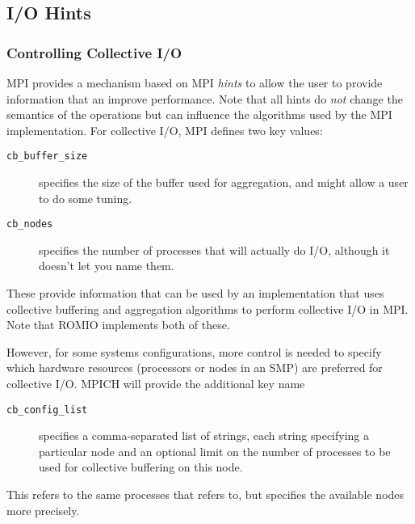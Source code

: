 \subsection{I/O Hints}

\subsubsection{Controlling Collective I/O}

MPI provides a mechanism based on MPI \emph{hints} to allow the user to
provide information that an improve performance.  Note that all hints do
\emph{not} change the semantics of the operations but can influence the
algorithms used by the MPI implementation.  For collective I/O, MPI defines
two  key values:
\begin{description}
\item[\texttt{cb_buffer_size}] specifies the size of the buffer used for
  aggregation, and might allow a user to do some tuning.
\item[\texttt{cb_nodes}]specifies the number of processes that will actually
  do I/O, although it doesn't let you name them.
\end{description}
These provide information that can be used by an implementation that uses
collective buffering and aggregation algorithms to perform collective I/O in
MPI.  Note that ROMIO implements both of these.


However, for some systems configurations, more control is needed to specify
which hardware resources (processors or nodes in an SMP) are preferred for
collective I/O.  MPICH will provide the additional  key name
\begin{description}
\item[\texttt{cb_config_list}]specifies a comma-separated list of strings,
  each string specifying a particular node and an optional limit on the number
  of processes to be used for collective buffering on this node.  
\end{description}
This refers to the same processes that  refers to, but
specifies the available nodes more precisely.

